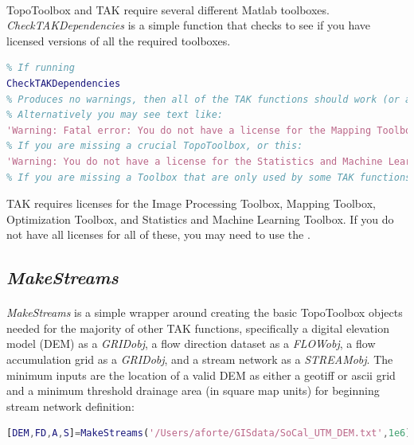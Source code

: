 \paragraph{}TopoToolbox and TAK require several different Matlab toolboxes. \textit{CheckTAKDependencies} is a simple function that checks to see if you have licensed versions of all the required toolboxes. 

\begin{lstlisting}[language=Matlab]
% CheckTAKDependencies takes no inputs and has no formal outputs
% If running 
CheckTAKDependencies
% Produces no warnings, then all of the TAK functions should work (or at least, they shouldn't fail because of missing dependencies!)
% Alternatively you may see text like:
'Warning: Fatal error: You do not have a license for the Mapping Toolbox, TopoToolbox will not function properly'
% If you are missing a crucial TopoToolbox, or this:
'Warning: You do not have a license for the Statistics and Machine Learning Toolbox, some functions will not work properly'
% If you are missing a Toolbox that are only used by some TAK functions
\end{lstlisting}

\noindent
TAK requires licenses for the Image Processing Toolbox, Mapping Toolbox, Optimization Toolbox, and Statistics and Machine Learning Toolbox. If you do not have all licenses for all of these, you may need to use the .

\subsection{\textit{MakeStreams}} \label{sec:MakeStreams}
\paragraph{}\textit{MakeStreams} is a simple wrapper around creating the basic TopoToolbox objects needed for the majority of other TAK functions, specifically a digital elevation model (DEM) as a \textit{GRIDobj}, a flow direction dataset as a \textit{FLOWobj}, a flow accumulation grid as a \textit{GRIDobj}, and a stream network as a \textit{STREAMobj}. The minimum inputs are the location of a valid DEM as either a geotiff or ascii grid and a minimum threshold drainage area (in square map units) for beginning stream network definition:
	
\begin{lstlisting}[language=Matlab]
[DEM,FD,A,S]=MakeStreams('/Users/aforte/GISdata/SoCal_UTM_DEM.txt',1e6);
\end{lstlisting}

